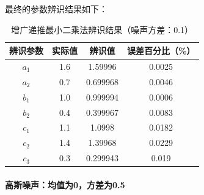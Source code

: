 \documentclass[UTF8]{article}
\begin{document}
最终的参数辨识结果如下：
\begin{table}[H]
\centering %
\begin{tabular}{cccc} %
    \toprule %
    辨识参数 & 实际值 & 辨识值 & 误差百分比（\%） \\
    \midrule %
    $a_1$ & 1.6 & 1.59996 & 0.0025 \\
    $a_2$ & 0.7 & 0.699968 & 0.0046 \\
    $b_1$ & 1.0 & 0.999994 & 0.0006 \\
    $b_2$ & 0.4 & 0.399967 & 0.0083 \\
    $c_1$ & 1.1 & 1.0998 & 0.0182 \\
    $c_2$ & 1.4 & 1.39968 & 0.0229 \\
    $c_3$ & 0.3 & 0.299943 & 0.019 \\
    \bottomrule %
\end{tabular}
\caption{增广递推最小二乘法辨识结果（噪声方差：0.1）} %
\end{table}

\paragraph{高斯噪声：均值为0，方差为0.5}~{}
\end{document}
